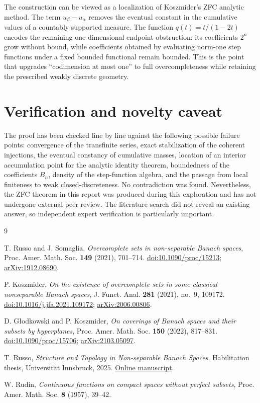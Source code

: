 \documentclass[11pt]{article}
\theoremstyle{remark}
\begin{document}
The construction can be viewed as a localization of Koszmider's ZFC analytic
method.  The term $u_\beta-u_\alpha$ removes the eventual constant in the
cumulative values of a countably supported measure.  The function
$q(t)=t/(1-2t)$ encodes the remaining one-dimensional endpoint obstruction:
its coefficients $2^n$ grow without bound, while coefficients obtained by
evaluating norm-one step functions under a fixed bounded functional remain
bounded.  This is the point that upgrades ``codimension at most one'' to full
overcompleteness while retaining the prescribed weakly discrete geometry.

\section*{Verification and novelty caveat}

The proof has been checked line by line against the following possible failure
points: convergence of the transfinite series, exact stabilization of the
coherent injections, the eventual constancy of cumulative masses, location of
an interior accumulation point for the analytic identity theorem, boundedness
of the coefficients $B_n$, density of the step-function algebra, and the
passage from local finiteness to weak closed-discreteness.  No contradiction
was found.  Nevertheless, the ZFC theorem in this report was produced during
this exploration and has not undergone external peer review.  The literature
search did not reveal an existing answer, so independent expert verification
is particularly important.

\begin{thebibliography}{9}

T. Russo and J. Somaglia,
\emph{Overcomplete sets in non-separable Banach spaces},
Proc. Amer. Math. Soc. \textbf{149} (2021), 701--714.
\href{https://doi.org/10.1090/proc/15213}{doi:10.1090/proc/15213};
\href{https://arxiv.org/abs/1912.08690}{arXiv:1912.08690}.

P. Koszmider,
\emph{On the existence of overcomplete sets in some classical nonseparable
Banach spaces},
J. Funct. Anal. \textbf{281} (2021), no.~9, 109172.
\href{https://doi.org/10.1016/j.jfa.2021.109172}{doi:10.1016/j.jfa.2021.109172};
\href{https://arxiv.org/abs/2006.00806}{arXiv:2006.00806}.

D. G\l{}odkowski and P. Koszmider,
\emph{On coverings of Banach spaces and their subsets by hyperplanes},
Proc. Amer. Math. Soc. \textbf{150} (2022), 817--831.
\href{https://doi.org/10.1090/proc/15706}{doi:10.1090/proc/15706};
\href{https://arxiv.org/abs/2103.05097}{arXiv:2103.05097}.

T. Russo,
\emph{Structure and Topology in Non-separable Banach Spaces},
Habilitation thesis, Universit\"at Innsbruck, 2025.
\href{https://www.uibk.ac.at/media/filer_public/6f/75/6f757188-ece0-4224-9c35-9dd22b2bc27d/habilitation_thesis.pdf}{Online manuscript}.

W. Rudin,
\emph{Continuous functions on compact spaces without perfect subsets},
Proc. Amer. Math. Soc. \textbf{8} (1957), 39--42.

\end{thebibliography}
\end{document}
